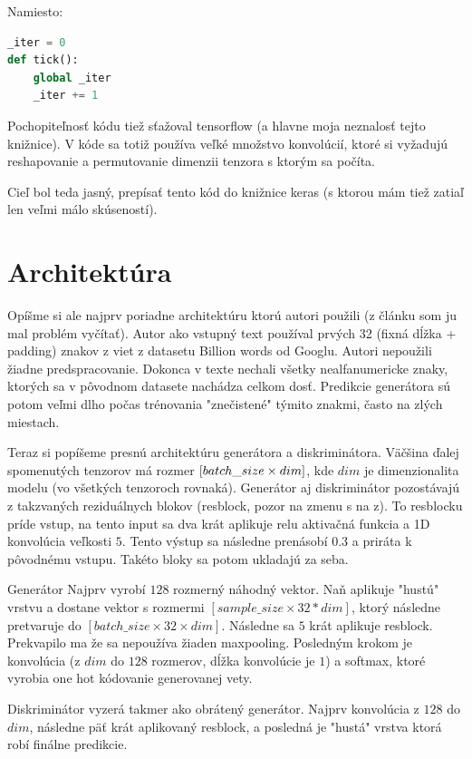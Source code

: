 \documentclass[10pt,a4paper]{article}
\begin{document}
Namiesto:
\begin{lstlisting}[language=Python]
_iter = 0
def tick():
	global _iter
	_iter += 1
\end{lstlisting}

Pochopiteľnosť kódu tiež sťažoval tensorflow (a hlavne moja neznalosť tejto knižnice). V kóde sa totiž používa veľké množstvo konvolúcií, ktoré si vyžadujú reshapovanie a permutovanie dimenzii tenzora s ktorým sa počíta.

Cieľ bol teda jasný, prepísať tento kód do knižnice keras (s ktorou mám tiež zatiaľ len veľmi málo skúseností). 

\section{Architektúra}
Opíšme si ale najprv poriadne architektúru ktorú autori použili (z článku som ju mal problém vyčítať). 
Autor ako vstupný text používal prvých 32 (fixná dĺžka + padding) znakov z viet z datasetu Billion words od Googlu. 
Autori nepoužili žiadne predspracovanie. Dokonca v texte nechali všetky nealfanumericke znaky, ktorých sa v pôvodnom datasete nachádza celkom dosť. Predikcie generátora sú potom veľmi dlho počas trénovania "znečistené" týmito znakmi, často na zlých miestach.

Teraz si popíšeme presnú architektúru generátora a diskriminátora. 
Väčšina ďalej spomenutých tenzorov má rozmer $[batch\_size \time 32 \times dim]$, kde $dim$ je dimenzionalita modelu (vo všetkých tenzoroch rovnaká).
Generátor aj diskriminátor pozostávajú z takzvaných reziduálnych blokov (resblock, pozor na zmenu s na z). 
To resblocku príde vstup, na tento input sa dva krát aplikuje relu aktivačná funkcia a 1D konvolúcia veľkosti $5$. 
Tento výstup sa následne prenásobí $0.3$ a priráta k pôvodnému vstupu.
Takéto bloky sa potom ukladajú za seba.

Generátor Najprv vyrobí $128$ rozmerný náhodný vektor. Naň aplikuje "hustú" vrstvu a dostane vektor s rozmermi $[sample\_size \times 32*dim]$, 
ktorý následne pretvaruje do $[batch\_size \times 32 \times dim]$. 
Následne sa $5$ krát aplikuje resblock. Prekvapilo ma že sa nepoužíva žiaden maxpooling.
Posledným krokom je konvolúcia (z $dim$ do $128$ rozmerov, dĺžka konvolúcie je $1$) a softmax, ktoré vyrobia one hot kódovanie generovanej vety.

Diskriminátor vyzerá takmer ako obrátený generátor. 
Najprv konvolúcia z $128$ do $dim$, následne päť krát aplikovaný resblock, a posledná je "hustá" vrstva ktorá robí finálne predikcie. 
\end{document}
